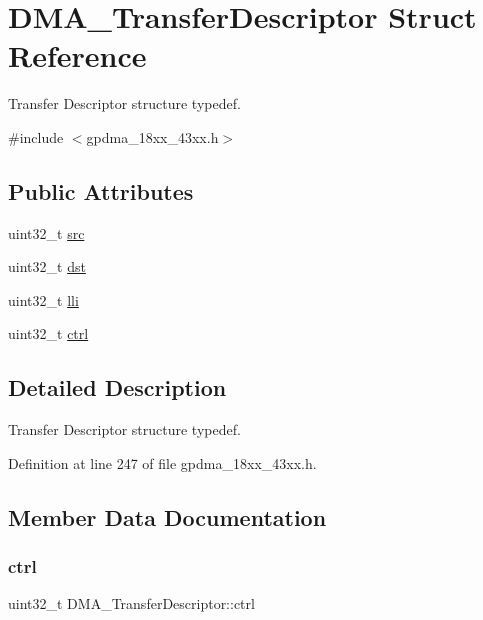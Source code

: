 \hypertarget{struct_d_m_a___transfer_descriptor}{}\section{D\+M\+A\+\_\+\+Transfer\+Descriptor Struct Reference}
\label{struct_d_m_a___transfer_descriptor}


Transfer Descriptor structure typedef.  




{\ttfamily \#include $<$gpdma\+\_\+18xx\+\_\+43xx.\+h$>$}

\subsection*{Public Attributes}
\begin{DoxyCompactItemize}
\item 
uint32\+\_\+t \hyperlink{struct_d_m_a___transfer_descriptor_a03862efce0e0845dce0cd47e51ed038f}{src}
\item 
uint32\+\_\+t \hyperlink{struct_d_m_a___transfer_descriptor_a661ff33fa31f405b89905f385299e271}{dst}
\item 
uint32\+\_\+t \hyperlink{struct_d_m_a___transfer_descriptor_ad53035ccb28664c56800a73bb20a7c79}{lli}
\item 
uint32\+\_\+t \hyperlink{struct_d_m_a___transfer_descriptor_a6b9f6124eb0961c8ccea5c455d135e60}{ctrl}
\end{DoxyCompactItemize}


\subsection{Detailed Description}
Transfer Descriptor structure typedef. 

Definition at line 247 of file gpdma\+\_\+18xx\+\_\+43xx.\+h.



\subsection{Member Data Documentation}
\mbox{\label{struct_d_m_a___transfer_descriptor_a6b9f6124eb0961c8ccea5c455d135e60}} 
\subsubsection{\texorpdfstring{ctrl}{ctrl}}
{\footnotesize\ttfamily uint32\+\_\+t D\+M\+A\+\_\+\+Transfer\+Descriptor\+::ctrl}

